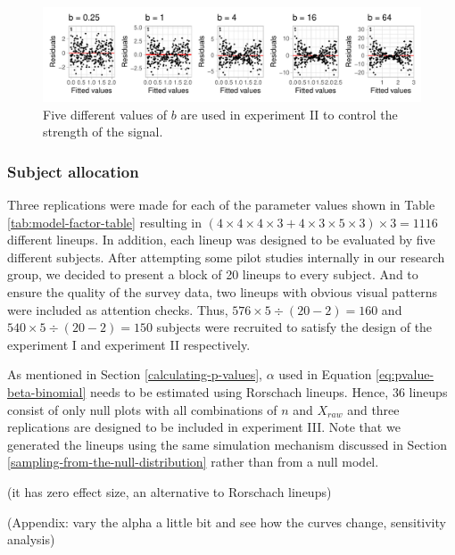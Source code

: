 \documentclass[]{interact}
\theoremstyle{plain}%
\theoremstyle{definition}
\theoremstyle{remark}
\begin{document}
\begin{figure}

{\centering \includegraphics[width=1\linewidth]{paper_comparison_files/figure-latex/different-b-1} 

}

\caption{Five different values of $b$ are used in experiment II to control the strength of the signal.}\label{fig:different-b}
\end{figure}

\hypertarget{subject-allocation}{%
\subsubsection{Subject allocation}\label{subject-allocation}}

Three replications were made for each of the parameter values shown in
Table \ref{tab:model-factor-table} resulting in
\((4 \times 4 \times 4 \times 3 + 4 \times 3 \times 5 \times 3) \times 3 = 1116\)
different lineups. In addition, each lineup was designed to be evaluated
by five different subjects. After attempting some pilot studies
internally in our research group, we decided to present a block of 20
lineups to every subject. And to ensure the quality of the survey data,
two lineups with obvious visual patterns were included as attention
checks. Thus, \(576 \times 5 \div (20-2) = 160\) and
\(540 \times 5 \div (20-2) = 150\) subjects were recruited to satisfy
the design of the experiment I and experiment II respectively.

As mentioned in Section \ref{calculating-p-values}, \(\alpha\) used in
Equation \ref{eq:pvalue-beta-binomial} needs to be estimated using
Rorschach lineups. Hence, 36 lineups consist of only null plots with all
combinations of \(n\) and \(X_{raw}\) and three replications are
designed to be included in experiment III. Note that we generated the
lineups using the same simulation mechanism discussed in Section
\ref{sampling-from-the-null-distribution} rather than from a null model.

(it has zero effect size, an alternative to Rorschach lineups)

(Appendix: vary the alpha a little bit and see how the curves change,
sensitivity analysis)
\end{document}

